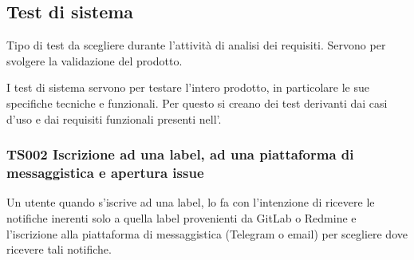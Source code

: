\subsection{Test di sistema} \label{testsistema} %
Tipo di test da scegliere durante l'attività di analisi dei requisiti. Servono per svolgere la validazione del prodotto.

I test di sistema servono per testare l'intero prodotto, in particolare le sue specifiche tecniche e funzionali.
Per questo si creano dei test derivanti dai casi d'uso e dai requisiti funzionali presenti nell'\AdRd.

%
%
%

	
	\subsubsection{TS002 Iscrizione ad una label, ad una piattaforma di messaggistica e apertura issue}
		Un utente quando s'iscrive ad una label, lo fa con l'intenzione di ricevere le notifiche inerenti solo a quella label provenienti da GitLab o Redmine e l'iscrizione alla piattaforma di messaggistica (Telegram o email) per scegliere dove ricevere tali notifiche.
		
